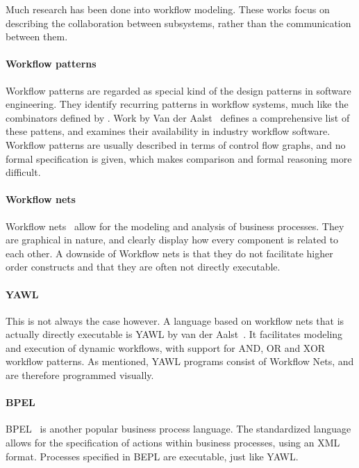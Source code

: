 Much research has been done into workflow modeling. These works focus on
describing the collaboration between subsystems, rather than the communication
between them.

\paragraph{Workflow patterns}

Workflow patterns are regarded as special kind of the design patterns in
software engineering. They identify recurring patterns in workflow systems, much
like the combinators defined by \TOPHAT. Work by Van der
Aalst~\cite{journals/dpd/AalstHKB03} defines a comprehensive list of these
pattens, and examines their availability in industry workflow software.
Workflow patterns are usually described in terms of control flow graphs, and no
formal specification is given, which makes comparison and formal reasoning more
difficult.

\paragraph{Workflow nets}

Workflow nets~\cite{journals/jcsc/Aalst98} allow for the modeling and analysis
of business processes. They are graphical in nature, and clearly display how
every component is related to each other. A downside of Workflow nets is that
they do not facilitate higher order constructs and that they are often not
directly executable.

\paragraph{YAWL}

This is not always the case however. A language based on workflow nets that is
actually directly executable is YAWL by van der
Aalst~\cite{DBLP:journals/is/AalstH05}. It facilitates modeling and execution of
dynamic workflows, with support for AND, OR and XOR workflow patterns. As
mentioned, YAWL programs consist of Workflow Nets, and are therefore programmed
visually.

\paragraph{BPEL}

BPEL~\cite{bpel} is another popular business process language. The standardized
language allows for the specification of actions within business processes,
using an XML format. Processes specified in BEPL are executable, just like YAWL.


